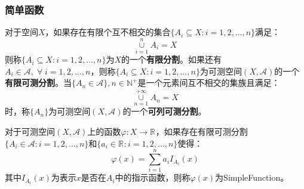 \subsubsection{简单函数}
\begin{definition}
	对于空间$X$，如果存在有限个互不相交的集合$\{A_i\subseteq X:i=1,2,\dots,n\}$满足：
	\begin{equation*}
		\underset{i=1}{\overset{n}{\cup}}A_i=X
	\end{equation*}
	则称$\{A_i\subseteq X:i=1,2,\dots,n\}$为$X$的一个\textbf{有限分割}。如果还有$A_i\in \mathscr{A},\;\forall\;i=1,2,\dots,n$，则称$\{A_i\subseteq X:i=1,2,\dots,n\}$为可测空间$(X,\mathscr{A})$的一个\textbf{有限可测分割}。当$\{A_n\in\mathscr{A}\},n\in\mathbb{N}^+$是一个元素间互不相交的集族且满足：
	\begin{equation*}
		\underset{n=1}{\overset{+\infty}{\cup}}A_n=X
	\end{equation*}
	时，称$\{A_n\}$为可测空间$(X,\mathscr{A})$的一个\textbf{可列可测分割}。
\end{definition}
\begin{definition}
	对于可测空间$(X,\mathscr{A})$上的函数$\varphi:X\rightarrow \mathbb{R}^{}$，如果存在有限可测分割$\{A_i\in \mathscr{A}:i=1,2,\dots,n\}$和$\{a_i\in\mathbb{R}^{}:i=1,2,\dots,n\}$使得：
	\begin{equation*}
		\varphi(x)=\sum_{i=1}^{n}a_iI_{A_i}(x)
	\end{equation*}
	其中$I_{A_i}(x)$为表示$x$是否在$A_i$中的指示函数，则称$\varphi(x)$为\gls{SimpleFunction}。
\end{definition}

